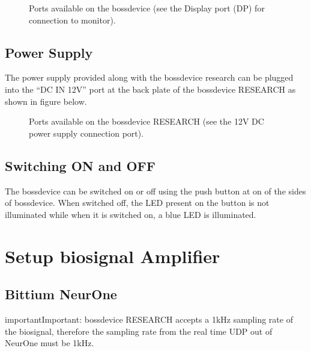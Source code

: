 \documentclass[letterpaper,10pt,english]{sphinxmanual}
\begin{document}
\begin{figure}[htbp]
\centering
\capstart

\noindent{}
\caption{Ports available on the bossdevice (see the Display port (DP) for connection to monitor).}\label{\detokenize{2_setup_bossdevice_research:id6}}\end{figure}


\section{Power Supply}
\label{\detokenize{2_setup_bossdevice_research:power-supply}}
\sphinxAtStartPar
The power supply provided along with the bossdevice research can be plugged into the “DC IN 12V” port at the back plate of the bossdevice RESEARCH as shown in figure below.

\begin{figure}[htbp]
\centering
\capstart

\noindent{}
\caption{Ports available on the bossdevice RESEARCH (see the 12V DC power supply connection port).}\label{\detokenize{2_setup_bossdevice_research:id7}}\end{figure}


\section{Switching ON and OFF}
\label{\detokenize{2_setup_bossdevice_research:switching-on-and-off}}
\sphinxAtStartPar
The bossdevice can be switched on or off using the push button at on of the sides of bossdevice. When switched off, the LED present on the button is not illuminated while when it is switched on, a blue LED is illuminated.


\chapter{Setup biosignal Amplifier}
\label{\detokenize{3_setup_biosignal_amplifier:setup-biosignal-amplifier}}\label{\detokenize{3_setup_biosignal_amplifier::doc}}

\section{Bittium NeurOne}
\label{\detokenize{3_setup_biosignal_amplifier:bittium-neurone}}
\begin{sphinxadmonition}{important}{Important:}
\sphinxAtStartPar
bossdevice RESEARCH accepts a 1kHz sampling rate of the biosignal, therefore the sampling rate from the real time UDP out of NeurOne must be 1kHz.
\end{sphinxadmonition}
\end{document}
